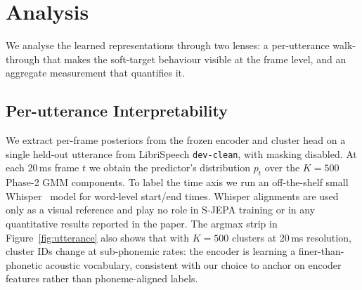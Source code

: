 \documentclass[9pt,twocolumn]{article}
\theoremstyle{plain}
\theoremstyle{definition}
\theoremstyle{remark}
\begin{document}
\section{Analysis}
\label{sec:analysis}


We analyse the learned representations through two lenses: a per-utterance walk-through that makes the soft-target behaviour visible at the frame level, and an aggregate measurement that quantifies it.

\subsection{Per-utterance Interpretability}
\label{sec:per_utterance}

We extract per-frame posteriors from the frozen encoder and cluster head on a single held-out utterance from LibriSpeech \texttt{dev-clean}, with masking disabled. At each 20\,ms frame $t$ we obtain the predictor's distribution $p_t$ over the $K = 500$ Phase-2 GMM components. To label the time axis we run an off-the-shelf small Whisper~\citep{radford2022robustspeechrecognitionlargescale} model for word-level start/end times. Whisper alignments are used only as a visual reference and play no role in S-JEPA training or in any quantitative results reported in the paper. The argmax strip in Figure~\ref{fig:utterance} also shows that with $K = 500$ clusters at 20\,ms resolution, cluster IDs change at sub-phonemic rates: the encoder is learning a finer-than-phonetic acoustic vocabulary, consistent with our choice to anchor on encoder features rather than phoneme-aligned labels.
\end{document}
